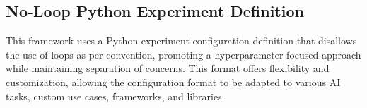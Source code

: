

\subsection{No-Loop Python Experiment Definition}

This framework uses a Python experiment configuration definition that disallows the use of loops as per convention, promoting a hyperparameter-focused approach while maintaining separation of concerns. This format offers flexibility and customization, allowing the configuration format to be adapted to various AI tasks, custom use cases, frameworks, and libraries.







